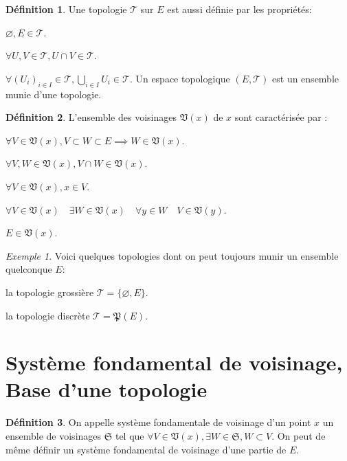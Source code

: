 \documentclass[a4paper, 11pt, french]{book}
\newenvironment{itemise}{\itemize}{\enditemize}
\theoremstyle{plain} %
\theoremstyle{definition} %
\newtheorem{definition}{Définition}
\theoremstyle{remark} %
\newtheorem{exemple}{Exemple}
\newcommand{\1}{\mathds{1}}
\newcommand\vide{\varnothing}
\begin{document}
\begin{definition}
	Une topologie $\mathscr{T}$ sur $E$ est aussi définie par les propriétés:
	\begin{itemise}
		\item $\vide, E\in\mathscr{T}$.
		\item $\forall U, V\in\mathscr{T}, U\cap V\in\mathscr{T}$.
		\item $\forall (U_i)_{i\in I}\in\mathscr{T}, \bigcup_{i\in I}U_i\in\mathscr{T}$.
	\end{itemise}
	Un espace topologique $(E, \mathscr{T})$ est un ensemble munie d'une topologie.
\end{definition}

\begin{definition}
	L'ensemble des voisinages $\mathfrak{V}(x)$ de $x$ sont caractérisée par : 
	\begin{itemise}
		\item $\forall V\in\mathfrak{V}(x), V\subset W\subset E\implies W\in\mathfrak{V}(x)$.
		\item $\forall V, W\in\mathfrak{V}(x), V\cap W\in\mathfrak{V}(x)$.
		\item $\forall V\in\mathfrak{V}(x), x\in V$.
		\item $\forall V\in\mathfrak{V}(x)\quad\exists W\in\mathfrak{V}(x)\quad\forall y\in W\quad V\in\mathfrak{V}(y)$.
		\item $E\in\mathfrak{V}(x)$.
	\end{itemise}
\end{definition}

\begin{exemple}
	Voici quelques topologies dont on peut toujours munir un ensemble quelconque $E$:
	\begin{itemise}
		\item la topologie grossière $\mathscr{T}=\{\vide, E\}$.
		\item la topologie discrète $\mathscr{T}=\mathfrak{P}(E)$.
	\end{itemise}
\end{exemple}

\section{Système fondamental de voisinage, Base d'une topologie}

\begin{definition}
	On appelle système fondamentale de voisinage d'un point $x$ un ensemble de voisinages $\mathfrak{S}$ tel que $\forall V\in\mathfrak{V}(x), \exists W\in\mathfrak{S}, W\subset V$. On peut de même définir un système fondamental de voisinage d'une partie de $E$.
\end{definition}
\end{document}
